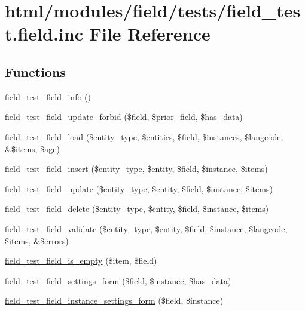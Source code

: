 \hypertarget{field__test_8field_8inc}{
\section{html/modules/field/tests/field\_\-test.field.inc File Reference}
\label{field__test_8field_8inc}
}
\subsection*{Functions}
\begin{DoxyCompactItemize}
\item 
\hyperlink{field__test_8field_8inc_a2ca4cc9829f50f1b4af62c7dd0deedd8}{field\_\-test\_\-field\_\-info} ()
\item 
\hyperlink{field__test_8field_8inc_a56f021d7534dd5e137a9df0b3ab6f968}{field\_\-test\_\-field\_\-update\_\-forbid} (\$field, \$prior\_\-field, \$has\_\-data)
\item 
\hyperlink{field__test_8field_8inc_a35f039a5f1cc50656fa18cd9f4089dc5}{field\_\-test\_\-field\_\-load} (\$entity\_\-type, \$entities, \$field, \$instances, \$langcode, \&\$items, \$age)
\item 
\hyperlink{field__test_8field_8inc_aa0e256bbadf643c7fc4471b9d89e5b97}{field\_\-test\_\-field\_\-insert} (\$entity\_\-type, \$entity, \$field, \$instance, \$items)
\item 
\hyperlink{field__test_8field_8inc_a199206c85728b6a0bf45265ceb8a0a9c}{field\_\-test\_\-field\_\-update} (\$entity\_\-type, \$entity, \$field, \$instance, \$items)
\item 
\hyperlink{field__test_8field_8inc_a464cdbf377c9cb309ce5c1257be479a3}{field\_\-test\_\-field\_\-delete} (\$entity\_\-type, \$entity, \$field, \$instance, \$items)
\item 
\hyperlink{field__test_8field_8inc_a20048bb4491985bdb9c7d491adf2c006}{field\_\-test\_\-field\_\-validate} (\$entity\_\-type, \$entity, \$field, \$instance, \$langcode, \$items, \&\$errors)
\item 
\hyperlink{field__test_8field_8inc_a6334e0fe1febc5e87cfa9f2f5eabf57e}{field\_\-test\_\-field\_\-is\_\-empty} (\$item, \$field)
\item 
\hyperlink{field__test_8field_8inc_a2f0acb45a789bf7e14b2e3262353e673}{field\_\-test\_\-field\_\-settings\_\-form} (\$field, \$instance, \$has\_\-data)
\item 
\hyperlink{field__test_8field_8inc_a91617d4f37b83ba80955d8adf798fe60}{field\_\-test\_\-field\_\-instance\_\-settings\_\-form} (\$field, \$instance)

\end{DoxyCompactItemize}
